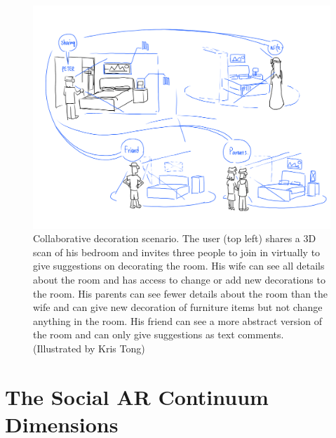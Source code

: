 \begin{figure}
    \centering
    \includegraphics[width=\linewidth]{images/30-continuum/illustrations/1_Remote_Bed.png}
    \caption{Collaborative decoration scenario. The user (top left) shares a 3D scan of his bedroom and invites three people to join in virtually to give suggestions on decorating the room. His wife can see all details about the room and has access to change or add new decorations to the room. His parents can see fewer details about the room than the wife and can give new decoration of furniture items but not change anything in the room. His friend can see a more abstract version of the room and can only give suggestions as text comments.  (Illustrated by Kris Tong)}
    \label{fig:illustration:remote-bed}
\end{figure}

\section{The Social AR Continuum Dimensions}

